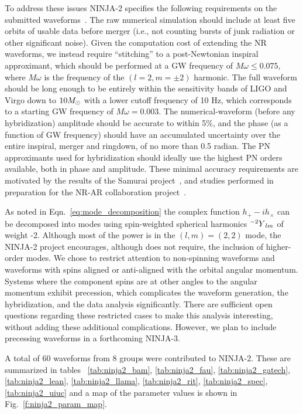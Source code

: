 To address these issues NINJA-2 specifies the following requirements
on the submitted waveforms~\cite{ninja2-wiki}.  The raw numerical
simulation should include at least five orbits of usable data before
merger (i.e., not counting bursts of junk radiation or other
significant noise).  Given the computation cost of extending the NR
waveforms, we instead require ``stitching'' to a post-Newtonian
inspiral approximant, which should be performed at a GW frequency of
$M\omega \leq 0.075$, where $M\omega$ is the frequency of the $(l = 2,
m = \pm 2)$ harmonic. The full waveform should be long enough to be
entirely within the sensitivity bands of LIGO and Virgo down to $10
M_\odot$ with a lower cutoff frequency of 10 Hz, which corresponds to a
starting GW frequency of $M\omega = 0.003$.  The numerical-waveform
(before any hybridization) amplitude should be accurate to within 5\%,
and the phase (as a function of GW frequency) should have an
accumulated uncertainty over the entire inspiral, merger and ringdown,
of no more than 0.5 radian.  The PN approximants used for
hybridization should ideally use the highest PN orders available, both
in phase and amplitude.  These minimal accuracy requirements are
motivated by the results of the Samurai project~\cite{Hannam:2009hh},
and studies performed in preparation for the NR-AR collaboration
project~\cite{ninja-wiki}.

As noted in Eqn.~\ref{eq:mode_decomposition} the complex function
$h_+-ih_\times$ can be decomposed into modes using spin-weighted
spherical harmonics ${{}^{-2}Y}_{lm}$ of weight -2.  Although most of the
power is in the $(l,m)=(2,2)$ mode, the NINJA-2 project encourages,
although does not require, the inclusion of higher-order modes.  We
chose to restrict attention to non-spinning waveforms and waveforms
with spins aligned or anti-aligned with the orbital angular momentum.
Systems where the component spins are at other angles to the angular
momentum exhibit precession, which complicates the waveform
generation, the hybridization, and the data analysis significantly.
There are sufficient open questions regarding these restricted cases
to make this analysis interesting, without adding these additional
complications.  However, we plan to include precessing waveforms in a
forthcoming NINJA-3.

A total of 60 waveforms from 8 groups were contributed to NINJA-2.
These are summarized in tables ~\ref{tab:ninja2_bam},
\ref{tab:ninja2_fau}, \ref{tab:ninja2_gatech}, \ref{tab:ninja2_lean},
\ref{tab:ninja2_llama}, \ref{tab:ninja2_rit}, \ref{tab:ninja2_spec},
\ref{tab:ninja2_uiuc} and a map of the parameter values is shown in
Fig.~\ref{f:ninja2_param_map}.

